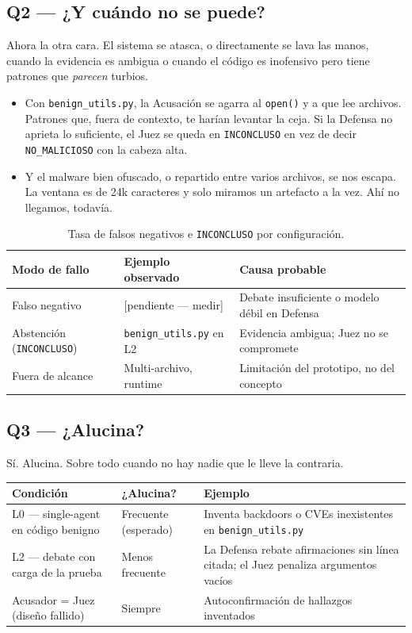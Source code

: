 \documentclass[10pt]{article}
\begin{document}
\subsection{Q2 --- ¿Y cuándo no se puede?}

Ahora la otra cara. El sistema se atasca, o directamente se lava las manos, cuando la
evidencia es ambigua o cuando el código es inofensivo pero tiene patrones que
\textit{parecen} turbios.

\begin{itemize}[leftmargin=*]
  \item Con \texttt{benign\_utils.py}, la Acusación se agarra al \texttt{open()} y a que
  lee archivos. Patrones que, fuera de contexto, te harían levantar la ceja. Si la
  Defensa no aprieta lo suficiente, el Juez se queda en \texttt{INCONCLUSO} en vez de
  decir \texttt{NO\_MALICIOSO} con la cabeza alta.
  \item Y el malware bien ofuscado, o repartido entre varios archivos, se nos escapa. La
  ventana es de 24k caracteres y solo miramos un artefacto a la vez. Ahí no llegamos,
  todavía.
\end{itemize}

\begin{table}[h]
\centering
\small
\begin{tabularx}{\textwidth}{@{}L{4cm} L{4cm} X@{}}
\toprule
Modo de fallo & Ejemplo observado & Causa probable \\
\midrule
Falso negativo & [pendiente --- medir] & Debate insuficiente o modelo débil en Defensa \\
Abstención (\texttt{INCONCLUSO}) & \texttt{benign\_utils.py} en L2 & Evidencia ambigua;
Juez no se compromete \\
Fuera de alcance & Multi-archivo, runtime & Limitación del prototipo, no del concepto \\
\bottomrule
\end{tabularx}
\caption{Tasa de falsos negativos e \texttt{INCONCLUSO} por configuración.}
\end{table}

\subsection{Q3 --- ¿Alucina?}

Sí. Alucina. Sobre todo cuando no hay nadie que le lleve la contraria.

\begin{table}[h]
\centering
\small
\begin{tabularx}{\textwidth}{@{}L{4.5cm} L{2.5cm} X@{}}
\toprule
Condición & ¿Alucina? & Ejemplo \\
\midrule
L0 --- single-agent en código benigno & Frecuente (esperado) & Inventa backdoors o CVEs
inexistentes en \texttt{benign\_utils.py} \\
L2 --- debate con carga de la prueba & Menos frecuente & La Defensa rebate afirmaciones
sin línea citada; el Juez penaliza argumentos vacíos \\
Acusador = Juez (diseño fallido) & Siempre & Autoconfirmación de hallazgos inventados \\
\bottomrule
\end{tabularx}
\end{table}
\end{document}
